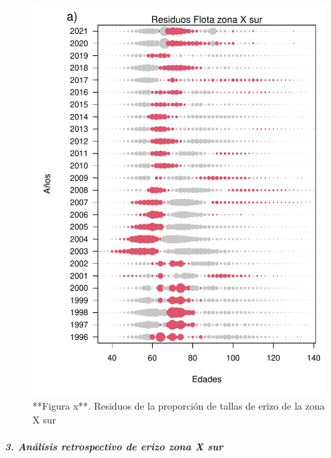 \documentclass[
]{article}
\begin{document}
\begin{figure}

{\centering \includegraphics{Figuras/Fig_residuosCompXS-1} 

}

\caption{**Figura x**. Residuos de la proporción de tallas de erizo de la zona X sur}\label{fig:Fig_residuosCompXS}
\end{figure}

\hypertarget{anuxe1lisis-retrospectivo-de-erizo-zona-x-sur}{%
\subparagraph{\texorpdfstring{\textbf{\emph{3. Análisis retrospectivo de
erizo zona X
sur}}}{3. Análisis retrospectivo de erizo zona X sur}}\label{anuxe1lisis-retrospectivo-de-erizo-zona-x-sur}}
\end{document}
